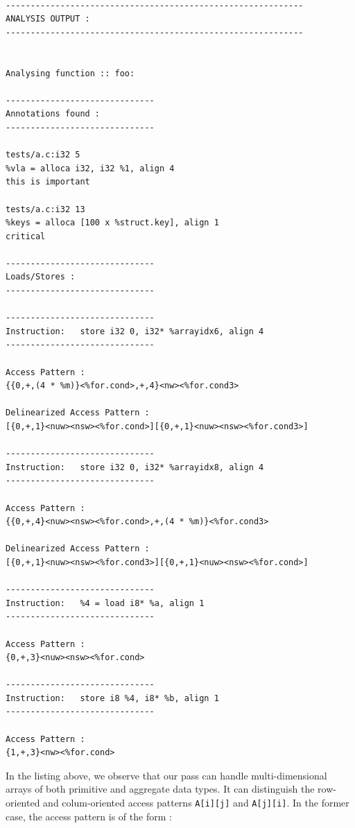 \documentclass[letterpaper]{article}
\begin{document}
\begin{lstlisting}[caption={Analysis Output},label={lst:output}]

------------------------------------------------------------
ANALYSIS OUTPUT :
------------------------------------------------------------


Analysing function :: foo:

------------------------------
Annotations found :
------------------------------

tests/a.c:i32 5           
%vla = alloca i32, i32 %1, align 4    
this is important

tests/a.c:i32 13          
%keys = alloca [100 x %struct.key], align 1   
critical

------------------------------
Loads/Stores :
------------------------------

------------------------------
Instruction:   store i32 0, i32* %arrayidx6, align 4
------------------------------

Access Pattern :
{{0,+,(4 * %m)}<%for.cond>,+,4}<nw><%for.cond3>

Delinearized Access Pattern :
[{0,+,1}<nuw><nsw><%for.cond>][{0,+,1}<nuw><nsw><%for.cond3>]

------------------------------
Instruction:   store i32 0, i32* %arrayidx8, align 4
------------------------------

Access Pattern :
{{0,+,4}<nuw><nsw><%for.cond>,+,(4 * %m)}<%for.cond3>

Delinearized Access Pattern :
[{0,+,1}<nuw><nsw><%for.cond3>][{0,+,1}<nuw><nsw><%for.cond>]

------------------------------
Instruction:   %4 = load i8* %a, align 1
------------------------------

Access Pattern :
{0,+,3}<nuw><nsw><%for.cond>

------------------------------
Instruction:   store i8 %4, i8* %b, align 1
------------------------------

Access Pattern :
{1,+,3}<nw><%for.cond>

\end{lstlisting}

In the listing above, we observe that our pass can handle multi-dimensional
arrays of both primitive and aggregate data types. It can distinguish
the row-oriented and colum-oriented access patterns \texttt{A[i][j]} and 
\texttt{A[j][i]}. In the former case, the access pattern is of the form :\\
  
\end{document}
